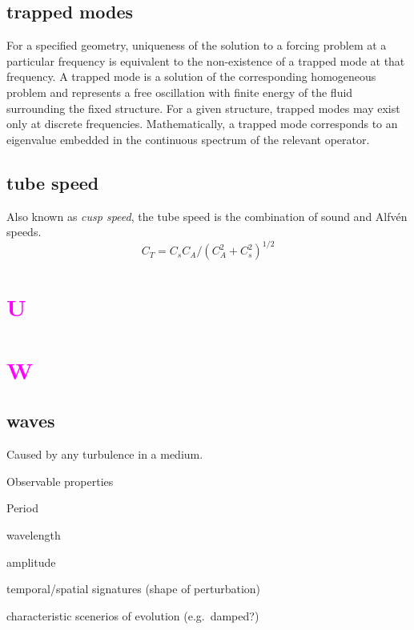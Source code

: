 \documentclass[12pt]{article}
\begin{document}
\subsection*{trapped modes}
For a specified geometry, uniqueness of the solution to a forcing problem
at a particular frequency is equivalent to the non-existence of a trapped
mode at that frequency. A trapped mode is a solution of the corresponding
homogeneous problem and represents a free oscillation with finite energy
of the fluid surrounding the fixed structure. For a given structure,
trapped modes may exist only at discrete frequencies.
Mathematically, a trapped mode corresponds to an eigenvalue embedded
in the continuous spectrum of the relevant operator.

\subsection*{tube speed}
Also known as \emph{cusp speed}, the tube speed is the combination of sound
and Alfv\'en speeds.
$$ C_T = C_sC_A/(C_A^2 + C_s^2)^{1/2} $$

\section*{\textcolor{magenta}{U}}
\section*{\textcolor{magenta}{W}}

\subsection*{waves}
\begin{itemize*}
    \item Caused by any turbulence in a medium.
    \item Observable properties
        \begin{itemize*}
            \item Period
            \item wavelength
            \item amplitude
            \item temporal/spatial signatures (shape of perturbation)
            \item characteristic scenerios of evolution (e.g.\ damped?)
        \end{itemize*}
\end{itemize*}
\end{document}
